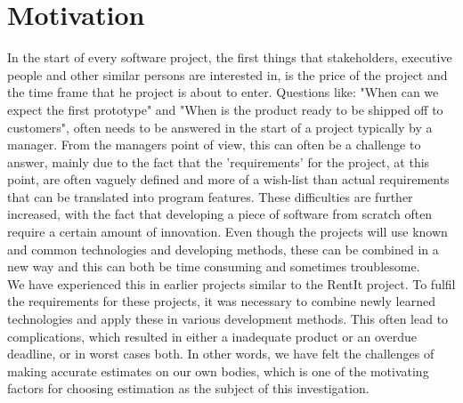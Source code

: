 \section{Motivation}
In the start of every software project, the first things that stakeholders, executive people and other similar persons are interested in, is the price of the project and the time frame that he project is about to enter. Questions like: "When can we expect the first prototype" and "When is the product ready to be shipped off to customers", often needs to be answered in the start of a project typically by a manager. From the managers point of view, this can often be a challenge to answer, mainly due to the fact that the 'requirements' for the project, at this point, are often vaguely defined and more of a wish-list than actual requirements that can be translated into program features. These difficulties are further increased, with the fact that developing a piece of software from scratch often require a certain amount of innovation\cite[p.139]{ProjectManagement_b}. Even though the projects will use known and common technologies and developing methods, these can be combined in a new way and this can both be time consuming and sometimes troublesome.\\ We have experienced this in earlier projects similar to the RentIt project. To fulfil the requirements for these projects, it was necessary to combine newly learned technologies and apply these in various development methods. This often lead to  complications, which resulted in either a inadequate product or an overdue deadline, or in worst cases both. In other words, we have felt the challenges of making accurate estimates on our own bodies, which is one of the motivating factors for choosing estimation as the subject of this investigation.\\


